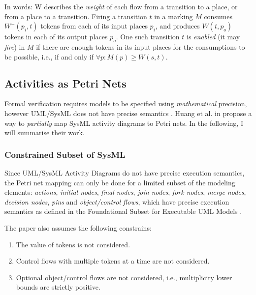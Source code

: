 In words: W describes the \emph{weight} of each flow from a transition to a place, or from a place to a transition. Firing a transition \(t\) in a marking \(M\) consumes \(W^-(p_i, t)\) tokens from each of its input places \(p_i\), and produces \(W(t, p_o)\) tokens in each of its output places \(p_o\). One such transition \(t\) is \emph{enabled} (it may \emph{fire}) in \(M\) if there are enough tokens in its input places for the consumptions to be possible, i.e., if and only if \( \forall p : M(p) \ge W(s, t)\).

\subsection{Activities as Petri Nets}\label{ssec:activities-as-petri-nets}

Formal verification requires models to be specified using \emph{mathematical} precision, however UML/SysML does not have precise semantics \cite{pssm-testing, pssm, euml}. Huang et al. in \cite{https://doi.org/10.1002/sys.21524} propose a way to \emph{partially} map SysML activity diagrams to Petri nets. In the following, I will summarise their work.

\subsubsection*{Constrained Subset of SysML}\label{ssec:sysml_assumptions}

Since UML/SysML Activity Diagrams do not have precise execution semantics, the Petri net mapping can only be done for a limited subset of the modeling elements: \emph{actions}, \emph{initial nodes}, \emph{final nodes}, \emph{join nodes}, \emph{fork nodes}, \emph{merge nodes}, \emph{decision nodes}, \emph{pins} and \emph{object/control flows}, which have precise execution semantics as defined in the Foundational Subset for Executable UML Models \cite{fuml}.

The paper also assumes the following constrains:

\begin{enumerate}
	\item The value of tokens is not considered.
	\item Control flows with multiple tokens at a time are not considered.
	\item Optional object/control flows are not considered, i.e., multiplicity lower bounds are strictly positive.
\end{enumerate}

